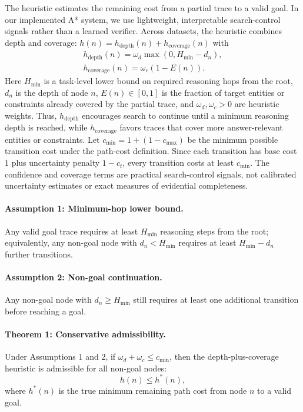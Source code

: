 \documentclass{article}
\begin{document}
The heuristic estimates the remaining cost from a partial trace to a valid goal. In our implemented A* system, we use lightweight, interpretable search-control signals rather than a learned verifier. Across datasets, the heuristic combines depth and coverage: $h(n)=h_{\mathrm{depth}}(n)+h_{\mathrm{coverage}}(n)$ with
\begin{multline}
h_{\mathrm{depth}}(n)=\omega_d\max(0,H_{\min}-d_n),
\\
h_{\mathrm{coverage}}(n)=\omega_c(1-E(n)).
\end{multline}
Here \(H_{\min}\) is a task-level lower bound on required reasoning hops from the root, \(d_n\) is the depth of node \(n\), \(E(n)\in[0,1]\) is the fraction of target entities or constraints already covered by the partial trace, and \(\omega_d,\omega_c>0\) are heuristic weights. Thus, \(h_{\mathrm{depth}}\) encourages search to continue until a minimum reasoning depth is reached, while \(h_{\mathrm{coverage}}\) favors traces that cover more answer-relevant entities or constraints. Let $c_{\min}=1+(1-c_{\max})$ be the minimum possible transition cost under the path-cost definition. Since each transition has base cost \(1\) plus uncertainty penalty \(1-c_t\), every transition costs at least \(c_{\min}\). The confidence and coverage terms are practical search-control signals, not calibrated uncertainty estimates or exact measures of evidential completeness.

\paragraph{Assumption 1: Minimum-hop lower bound.}
Any valid goal trace requires at least \(H_{\min}\) reasoning steps from the root; equivalently, any non-goal node with \(d_n < H_{\min}\) requires at least \(H_{\min}-d_n\) further transitions.

\paragraph{Assumption 2: Non-goal continuation.}
Any non-goal node with \(d_n\geq H_{\min}\) still requires at least one additional transition before reaching a goal.

\paragraph{Theorem 1: Conservative admissibility.}
Under Assumptions 1 and 2, if \(\omega_d+\omega_c\leq c_{\min}\), then the depth-plus-coverage heuristic is admissible for all non-goal nodes:
\[
h(n)\leq h^*(n),
\]
where \(h^*(n)\) is the true minimum remaining path cost from node \(n\) to a valid goal.
\end{document}
